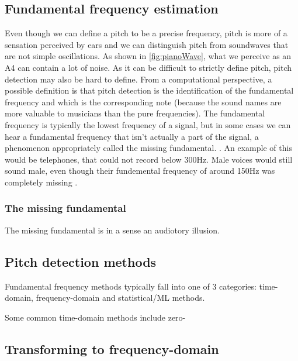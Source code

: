 % 
\subsection{Fundamental frequency estimation}
Even though we can define a pitch to be a precise frequency, pitch is more of a sensation perceived by ears and we can distinguish pitch from soundwaves that are not simple oscillations. As shown in \ref{fig:pianoWave}, what we perceive as an A4 can contain a lot of noise.  As it can be difficult to strictly define pitch, pitch detection may also be hard to define. From a computational perspective, a possible definition is that pitch detection is the identification of the fundamental frequency and which is the corresponding note (because the sound names are more valuable to musicians than the pure frequencies). The fundamental frequency is typically the lowest frequency of a signal, but in some cases we can hear a fundamental frequency that isn't actually a part of the signal, a phenomenon appropriately called the missing fundamental. . An example of this would be telephones, that could not record below 300Hz. Male voices would still sound male, even though their fundemental frequency of around 150Hz was completely missing .

\subsubsection{The missing fundamental}
The missing fundamental is in a sense an audiotory illusion.  

\subsection{Pitch detection methods}
Fundamental frequency methods typically fall into one of 3 categories: time-domain, frequency-domain and statistical/ML methods.

Some common time-domain methods include zero-

\subsection {Transforming to frequency-domain}
